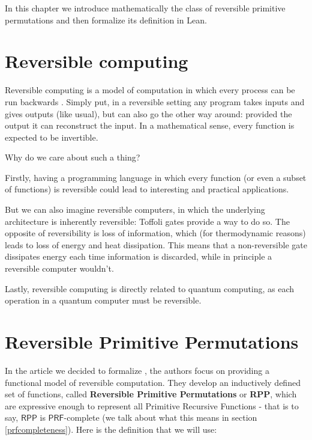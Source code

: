 \documentclass[oneside]{book}
\theoremstyle{definition}
\theoremstyle{remark}
\theoremstyle{plain}
\newcommand{\RPP}{\mathsf{RPP}}
\newcommand{\PRF}{\mathsf{PRF}}
\begin{document}
In this chapter we introduce mathematically the class of reversible primitive permutations
and then formalize its definition in Lean.

\section{Reversible computing}

Reversible computing is a model of computation in which every process can be run backwards \cite{Morita17}\cite{perumalla2013chc}.
Simply put, in a reversible setting any program takes inputs and gives outputs (like usual), but can also go the other way around:
provided the output it can reconstruct the input.
In a mathematical sense, every function is expected to be invertible.

Why do we care about such a thing?

Firstly, having a programming language in which every function (or even a subset of functions) is reversible could lead to interesting and practical applications.

But we can also imagine reversible computers, in which the underlying architecture is inherently reversible:
Toffoli gates provide a way to do so.
The opposite of reversibility is loss of information, which (for thermodynamic reasons) leads to loss of energy and heat dissipation.
This means that a non-reversible gate dissipates energy each time information is discarded, while in principle a reversible computer wouldn't.

Lastly, reversible computing is directly related to quantum computing, as each operation in a quantum computer must be reversible.


\section{Reversible Primitive Permutations}

In the article we decided to formalize \cite{PAOLINI2020218}, the authors focus on providing a functional model of reversible computation.
They develop an inductively defined set of functions, called \textbf{Reversible Primitive Permutations} or \textbf{RPP},
which are expressive enough to represent all Primitive Recursive Functions -
that is to say, $\RPP$ is $\PRF$-complete (we talk about what this means in section \ref{prfcompleteness}).
Here is the definition that we will use:

\newpage
\end{document}
